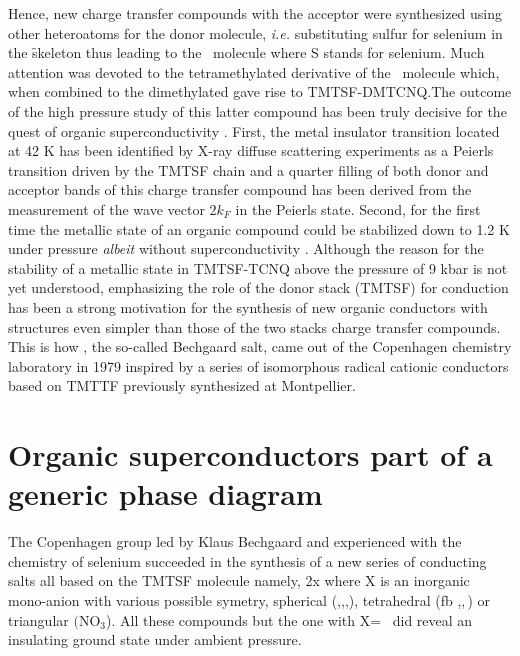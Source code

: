 \documentclass[11pt]{article} %
\begin{document}
Hence, new charge transfer compounds with the acceptor \q  were synthesized using
other heteroatoms for the donor molecule, 
\textit{i.e.} substituting sulfur for selenium in the \f skeleton thus leading to the \ts \, molecule where S stands for selenium.
Much attention was devoted to the
tetramethylated derivative of the \ts \, molecule which, when combined to the dimethylated \q gave rise to TMTSF-DMTCNQ\cite{Andersen78}.The
outcome of the high pressure study of this latter compound has been truly  decisive for the quest of organic superconductivity
\cite{Andersen78,Jacobsen78,Tomkiewicz78}. First, the metal insulator transition located at 42 K has been identified by  X-ray diffuse scattering experiments\cite{Pouget81} as a Peierls transition driven by the TMTSF chain and a quarter filling of both donor and acceptor bands of this charge transfer compound has been derived   from the measurement of the wave vector $2k_F$ in the Peierls state. Second, for the first time the metallic state of an organic compound could be stabilized down to 1.2 K  under pressure    \textit{albeit} without superconductivity \cite{Andrieux79a}. Although the reason for the stability of a metallic state in  TMTSF-TCNQ  above the pressure of 9 kbar is not yet understood, emphasizing the role of the donor stack (TMTSF) for conduction  has been a strong motivation for the synthesis of new organic conductors with  structures even simpler than those of  the  two stacks charge transfer compounds. This is how , the so-called Bechgaard salt\cite{Bechgaard79},  came out of the Copenhagen chemistry laboratory in 1979 inspired by a series of isomorphous radical cationic conductors based on TMTTF previously synthesized at Montpellier\cite{Galigne78}.

\section{ Organic superconductors part of a generic phase diagram}
The Copenhagen group led by Klaus Bechgaard and experienced with the chemistry of selenium  succeeded in the
synthesis of a new series of conducting salts all based on the  TMTSF  molecule  namely, \tms2x   where X is an inorganic
mono-anion with various possible symetry, spherical (\pf ,\as ,\sb ,\ta  ), tetrahedral (\4fb ,\cl ,\,\re )
 or triangular $\mathrm{(NO_3}$)\cite{Bechgaard79}. All these compounds but the one with X= \cl \, did reveal an insulating ground state under ambient pressure. 
\end{document}
